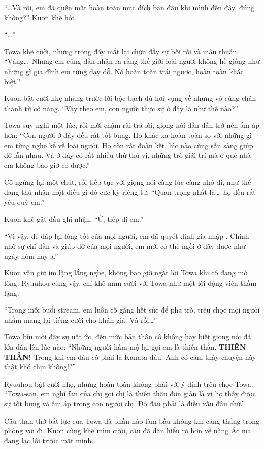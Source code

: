 \documentclass[../main.tex]{subfiles}
\begin{document}
``\dots Và rồi, em đã quên mất hoàn toàn mục đích ban đầu khi mình đến đây, đúng không?'' Kuon khẽ hỏi.

``\dots''

Towa khẽ cười, nhưng trong đáy mắt lại chứa đầy sự bối rối và mâu thuẫn. ``Vâng\dots\ Nhưng em cũng dần nhận ra rằng thế giới loài người không hề giống như những gì gia đình em từng dạy dỗ. Nó hoàn toàn trái ngược, hoàn toàn khác biệt.''

Kuon bật cười nhẹ nhàng trước lời bộc bạch dù hơi vụng về nhưng vô cùng chân thành từ cô nàng. ``Vậy theo em, con người thực sự ở đây là như thế nào?''

Towa suy nghĩ một lúc, rồi mới chậm rãi trả lời, giọng nói dần dần trở nên ấm áp hơn: ``Con người ở đây đều rất tốt bụng. Họ khác xa hoàn toàn so với những gì em từng nghe kể về loài người. Họ còn rất đoàn kết, lúc nào cũng sẵn sàng giúp đỡ lẫn nhau. Và ở đây có rất nhiều thứ thú vị, những trò giải trí mà ở quê nhà em không bao giờ có được.''

Cô ngừng lại một chút, rồi tiếp tục với giọng nói càng lúc càng nhỏ đi, như thể đang thú nhận một điều gì đó cực kỳ riêng tư: ``Quan trọng nhất là\dots\ họ đều rất yêu quý em.''

Kuon khẽ gật đầu ghi nhận. ``Ừ, tiếp đi em.''

``Vì vậy, để đáp lại lòng tốt của mọi người, em đã quyết định gia nhập \hll. Chính nhờ sự chỉ dẫn và giúp đỡ của mọi người, em mới có thể ngồi ở đây được như ngày hôm nay ạ.''

Kuon vẫn giữ im lặng lắng nghe, không bao giờ ngắt lời Towa khi cô đang mở lòng. Ryuuhou cũng vậy, chỉ khẽ mỉm cười với Towa như một lời động viên thầm lặng.

``Trong mỗi buổi stream, em luôn cố gắng hết sức để pha trò, trêu chọc mọi người nhằm mang lại tiếng cười cho khán giả. Và rồi\dots''

Towa bĩu môi đầy sự uất ức, đến mức bản thân cô không hay biết giọng nói đã lớn dần lên lúc nào: ``Những người hâm mộ lại gọi em là thiên thần. \textbf{THIÊN THẦN!} Trong khi em đâu có phải là Kanata đâu! Anh có cảm thấy chuyện này thật khó chịu không!?''

Ryuuhou bật cười nhẹ, nhưng hoàn toàn không phải với ý định trêu chọc Towa: ``Towa-san, em nghĩ fan của chị gọi chị là thiên thần đơn giản là vì họ thấy được sự tốt bụng và ấm áp trong con người chị. Đó đâu phải là điều xấu đâu chứ.''

Câu than thở bất lực của Towa đã phần nào làm bầu không khí căng thẳng trong phòng vơi đi. Kuon cũng khẽ mỉm cười, cậu đã dần hiểu rõ hơn về nàng Ác ma đang lạc lối trước mặt mình.
\end{document}
